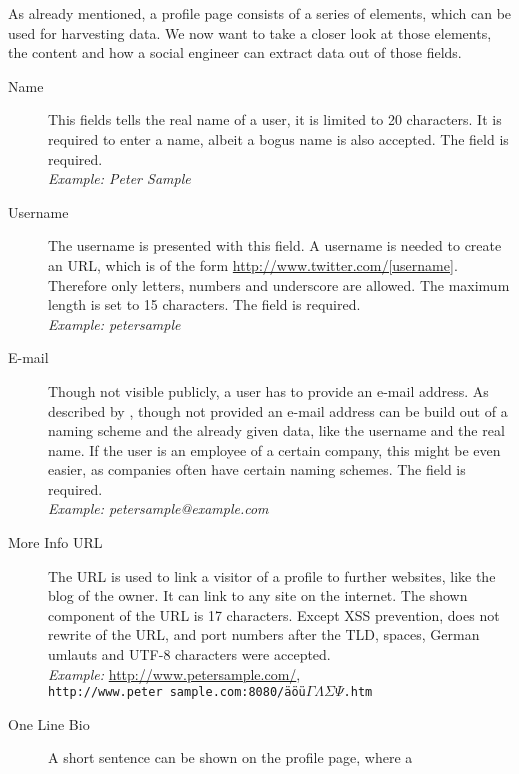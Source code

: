As already mentioned, a \Twitter{} profile page consists of a series of
elements, which can be used for harvesting data. We now want to take a closer
look at those elements, the content and how a social engineer can extract data
out of those fields.

\begin{description}
\item[Name] This fields tells the real name of a user, it is limited to 20
            characters. It is required to enter a name, albeit a bogus name is
            also accepted. The field is required.\\
            \textit{Example: Peter Sample}
\item[Username] The username is presented with this field. A username is needed
                to create an URL, which is of the form \url{http://www.twitter.com/[username]}.
                Therefore only letters, numbers and underscore are allowed. The maximum length
                is set to 15 characters. The field is required.\\
                \textit{Example: petersample}
\item[E-mail] Though not visible publicly, a \Twitter{} user has to provide an
              e-mail address. As described by \cite{brown2008}, though not provided an e-mail
              address can be build out of a naming scheme and the already
              given data, like the username and the real name. If the user
              is an employee of a certain company, this might be even easier,
              as companies often have certain naming schemes. The field is required.\\
              \textit{Example: petersample@example.com}
\item[More Info URL] The URL is used to link a visitor of a profile to further
                     websites, like the blog of the owner. It can link to
                     any site on the internet. The shown component of the
                     URL is 17 characters. Except XSS prevention,
                     \Twitter{} does not rewrite of the URL, and port numbers
                     after the TLD, spaces, German umlauts and UTF-8 characters were
                     accepted.\\
                     \textit{Example:} \url{http://www.petersample.com/},\\
                     \texttt{http://www.peter sample.com:8080/äöü$\Gamma\Lambda\Sigma\Psi$.htm}
\item[One Line Bio] A short sentence can be shown on the profile page, where a

\end{description}
